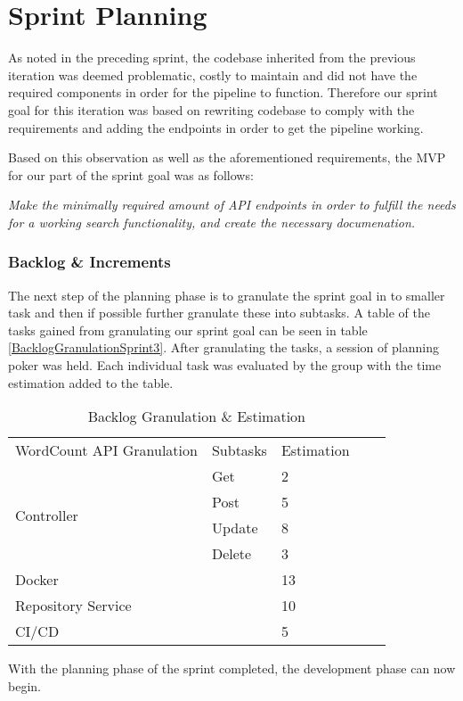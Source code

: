 \section{Sprint Planning}
As noted in the preceding sprint, the codebase inherited from the previous iteration was deemed problematic, costly to maintain and did not have the required components in order for the pipeline to function. 
Therefore our sprint goal for this iteration was based on rewriting codebase to comply with the requirements and adding the endpoints in order to get the pipeline working. 


Based on this observation as well as the aforementioned requirements, the MVP for our part of the sprint goal was as follows:
\vspace{\baselineskip}

\textit{Make the minimally required amount of API endpoints in order to fulfill the needs for a working search functionality, and create the necessary documenation.}

\subsubsection{Backlog \& Increments}
The next step of the planning phase is to granulate the sprint goal in to smaller task and then if possible further granulate these into subtasks. 
A table of the tasks gained from granulating our sprint goal can be seen in table \ref{BacklogGranulationSprint3}. 
After granulating the tasks, a session of planning poker was held. Each individual task was evaluated by the group with the time estimation added to the table. 
\begin{table}[h]
\centering
\begin{tabular}{|l|l|l|ll}
\cline{1-3}
WordCount API Granulation   & Subtasks & Estimation &  &  \\ \cline{1-3}
\multirow{4}{*}{Controller} & Get      & 2          &  &  \\ \cline{2-3}
                            & Post     & 5          &  &  \\ \cline{2-3}
                            & Update   & 8          &  &  \\ \cline{2-3}
                            & Delete   & 3          &  &  \\ \cline{1-3}
Docker                      &          & 13         &  &  \\ \cline{1-3}
Repository Service          &          & 10         &  &  \\ \cline{1-3}
CI/CD                       &          & 5          &  &  \\ \cline{1-3}
\end{tabular}
\caption{Backlog Granulation \& Estimation}
\label{BacklogEstimationSprint3}
\end{table}

With the planning phase of the sprint completed, the development phase can now begin. 




